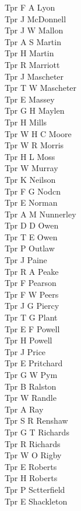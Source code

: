 \begin{multicols}{2}
  Tpr F A Lyon \\
  Tpr J McDonnell \\
  Tpr J W Mallon \\
  Tpr A S Martin \\
  Tpr H Martin \\
  Tpr R Marriott \\
  Tpr J Mascheter \\
  Tpr T W Mascheter \\
  Tpr E Massey \\
  Tpr G H Maylen \\
  Tpr H Mills \\
  Tpr W H C Moore \\
  Tpr W R Morris \\
  Tpr H L Moss \\
  Tpr W Murray \\
  Tpr K Neilson \\
  Tpr F G Nodcn \\
  Tpr E Norman \\
  Tpr A M Nunnerley \\
  Tpr D D Owen \\
  Tpr T E Owen \\
  Tpr P Outlaw \\
  Tpr J Paine \\
  Tpr R A Peake \\
  Tpr F Pearson \\
  Tpr F W Peers \\
  Tpr J G Piercy \\
  Tpr T G Plant \\
  Tpr E F Powell \\
  Tpr H Powell \\
  Tpr J Price \\
  Tpr E Pritchard \\
  Tpr G W Pym \\
  Tpr B Ralston \\
  Tpr W Randle \\
  Tpr A Ray \\
  Tpr S R Renshaw \\
  Tpr G T Richards \\
  Tpr R Richards \\
  Tpr W O Rigby \\
  Tpr E Roberts \\
  Tpr H Roberts \\
  Tpr P Sctterfield \\
  Tpr E Shackleton \\

\end{multicols}
